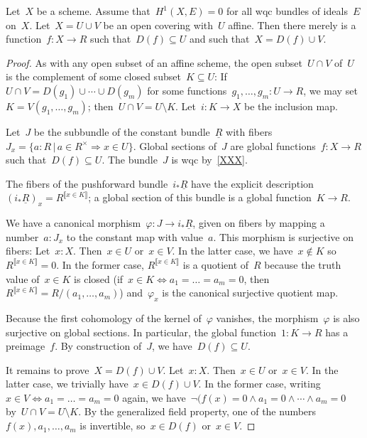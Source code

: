 
\begin{lemma}\label{serre-workhorse}
  Let~$X$ be a scheme. Assume that~$H^1(X, E) = 0$ for all wqc bundles of ideals~$E$
  on~$X$. Let~$X = U \cup V$ be an open covering with~$U$ affine. Then there
  merely is a function~$f : X \to R$ such that~$D(f) \subseteq U$ and such
  that~$X = D(f) \cup V$.
\end{lemma}

\begin{proof}
  As with any open subset of an affine scheme, the open subset~$U \cap V$
  of~$U$ is the complement of some closed subset~$K \subseteq U$:
  If~$U \cap V = D(g_1) \cup \cdots \cup D(g_m)$ for some
  functions~$g_1,\ldots,g_m : U \to R$, we may set~$K = V(g_1,\ldots,g_m)$;
  then~$U \cap V = U \setminus K$. Let~$i : K \to X$ be the inclusion map.

  Let~$J$ be the subbundle of the constant bundle~$\underline{R}$ with
  fibers~$J_x = \{ a : R \,|\, a \in R^\times \Rightarrow x \in U \}$.
  Global sections of~$J$ are global functions~$f : X \to R$ such that~$D(f)
  \subseteq U$. The bundle~$J$ is wqc by~\cref{XXX}.

  The fibers of the pushforward bundle~$i_*\underline{R}$ have the explicit
  description~$(i_*\underline{R})_x = R^{\llbracket x \in K \rrbracket}$; a
  global section of this bundle is a global function~$K \to R$.

  We have a canonical morphism~$\varphi : J \to i_*\underline{R}$, given on
  fibers by mapping a number~$a : J_x$ to the constant map with value~$a$. This
  morphism is surjective on fibers: Let~$x : X$. Then~$x \in U$ or~$x \in V$.
  In the latter case, we have~$x \not\in K$ so~$R^{\llbracket x \in K
  \rrbracket} = 0$. In the former case, $R^{\llbracket x \in K \rrbracket}$ is
  a quotient of~$R$ because the truth value of~$x \in K$ is closed (if~$x \in K
  \Leftrightarrow a_1 = \ldots = a_m = 0$, then~$R^{\llbracket x \in K
  \rrbracket} = R/(a_1,\ldots,a_m)$) and~$\varphi_x$ is the canonical
  surjective quotient map.

  Because the first cohomology of the kernel of~$\varphi$ vanishes, the
  morphism~$\varphi$ is also surjective on global sections. In particular, the
  global function~$1 : K \to R$ has a preimage~$f$. By construction of~$J$,
  we have~$D(f) \subseteq U$.

  It remains to prove~$X = D(f) \cup V$. Let~$x : X$. Then~$x \in U$ or~$x \in V$.
  In the latter case, we trivially have~$x \in D(f) \cup V$. In the former
  case, writing~$x \in V \Leftrightarrow a_1 = \ldots = a_m = 0$ again,
  we have~$\neg(f(x) = 0 \wedge a_1 = 0 \wedge \cdots \wedge a_m = 0$ by~$U
  \cap V = U \setminus K$. By the generalized field property, one of the
  numbers~$f(x), a_1, \ldots, a_m$ is invertible, so~$x \in D(f)$ or~$x \in V$.
\end{proof}

